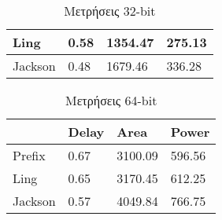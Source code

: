 \begin{multicols}{2}
\begin{table}[H]
\begin{tabular}{||p{1.2cm} | p{0.7cm} p{1cm} p{1cm} ||}
        Ling    & 0.58  & 1354.47    & 275.13 \\
        \hline
        Jackson & 0.48  & 1679.46    & 336.28 \\
        \hline
    \end{tabular}
\caption{Μετρήσεις 32-bit}
\label{result_table_32}
\end{table}
\begin{table}[H]
\centering
     \begin{tabular}{||p{1.2cm} | p{0.7cm} p{1cm} p{1cm} ||} 
        \hline
         & Delay & Area & Power \\ [0.5ex] 
        \hline\hline
        Prefix  & 0.67  & 3100.09    & 596.56 \\ 
        \hline
        Ling    & 0.65  & 3170.45    & 612.25 \\
        \hline
        Jackson & 0.57  & 4049.84    & 766.75 \\
        \hline
    \end{tabular}
\caption{Μετρήσεις 64-bit}
\label{result_table_64}
\end{table}
\end{multicols}












